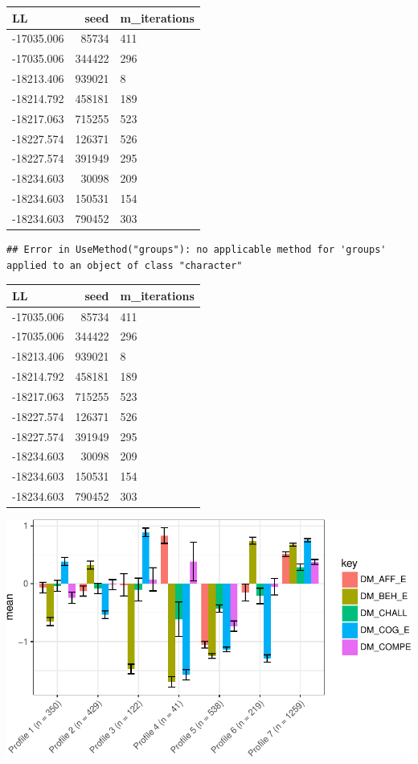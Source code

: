 \documentclass[]{msu-thesis}
\theoremstyle{definition}
\theoremstyle{definition}
\theoremstyle{definition}
\theoremstyle{remark}
\begin{document}
\begin{tabular}{l|r|l}
\hline
LL & seed & m\_iterations\\
\hline
-17035.006 & 85734 & 411\\
\hline
-17035.006 & 344422 & 296\\
\hline
-18213.406 & 939021 & 8\\
\hline
-18214.792 & 458181 & 189\\
\hline
-18217.063 & 715255 & 523\\
\hline
-18227.574 & 126371 & 526\\
\hline
-18227.574 & 391949 & 295\\
\hline
-18234.603 & 30098 & 209\\
\hline
-18234.603 & 150531 & 154\\
\hline
-18234.603 & 790452 & 303\\
\hline
\end{tabular}

\begin{verbatim}
## Error in UseMethod("groups"): no applicable method for 'groups' applied to an object of class "character"
\end{verbatim}

\begin{tabular}{l|r|l}
\hline
LL & seed & m\_iterations\\
\hline
-17035.006 & 85734 & 411\\
\hline
-17035.006 & 344422 & 296\\
\hline
-18213.406 & 939021 & 8\\
\hline
-18214.792 & 458181 & 189\\
\hline
-18217.063 & 715255 & 523\\
\hline
-18227.574 & 126371 & 526\\
\hline
-18227.574 & 391949 & 295\\
\hline
-18234.603 & 30098 & 209\\
\hline
-18234.603 & 150531 & 154\\
\hline
-18234.603 & 790452 & 303\\
\hline
\end{tabular}

\begin{center}\includegraphics[width=0.8\linewidth]{rosenberg-dissertation_files/figure-latex/m2_7p-1} \end{center}
\end{document}
